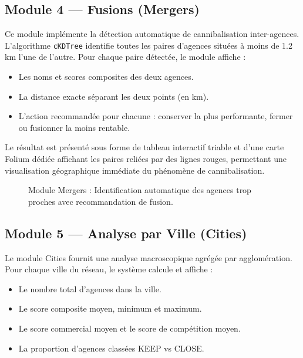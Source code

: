 
\subsection{Module 4 — Fusions (Mergers)}

Ce module implémente la détection automatique de cannibalisation inter-agences. L'algorithme \texttt{cKDTree} identifie toutes les paires d'agences situées à moins de 1.2 km l'une de l'autre. Pour chaque paire détectée, le module affiche :

\begin{itemize}
    \item Les noms et scores composites des deux agences.
    \item La distance exacte séparant les deux points (en km).
    \item L'action recommandée pour chacune : conserver la plus performante, fermer ou fusionner la moins rentable.
\end{itemize}

Le résultat est présenté sous forme de tableau interactif triable et d'une carte Folium dédiée affichant les paires reliées par des lignes rouges, permettant une visualisation géographique immédiate du phénomène de cannibalisation.

\begin{figure}[h]
    \centering
    \caption{Module Mergers : Identification automatique des agences trop proches avec recommandation de fusion.}
    \label{fig:screenshot_mergers}
\end{figure}

\subsection{Module 5 — Analyse par Ville (Cities)}

Le module Cities fournit une analyse macroscopique agrégée par agglomération. Pour chaque ville du réseau, le système calcule et affiche :

\begin{itemize}
    \item Le nombre total d'agences dans la ville.
    \item Le score composite moyen, minimum et maximum.
    \item Le score commercial moyen et le score de compétition moyen.
    \item La proportion d'agences classées KEEP vs CLOSE.
\end{itemize}

